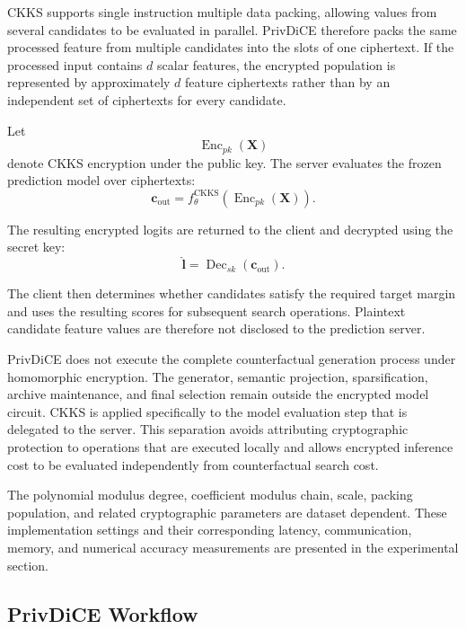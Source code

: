 \documentclass[preprint,12pt]{elsarticle}
\begin{document}
CKKS supports single instruction multiple data packing, allowing values from
several candidates to be evaluated in parallel. PrivDiCE therefore packs the
same processed feature from multiple candidates into the slots of one
ciphertext. If the processed input contains $d$ scalar features, the encrypted
population is represented by approximately $d$ feature ciphertexts rather than
by an independent set of ciphertexts for every candidate.

Let
\begin{equation}
\operatorname{Enc}_{pk}(\mathbf{X})
\end{equation}
denote CKKS encryption under the public key. The server evaluates the frozen
prediction model over ciphertexts:
\begin{equation}
\mathbf{c}_{\mathrm{out}}
=
f_{\theta}^{\mathrm{CKKS}}
\left(
\operatorname{Enc}_{pk}(\mathbf{X})
\right).
\label{eq:encrypted_inference}
\end{equation}

The resulting encrypted logits are returned to the client and decrypted using
the secret key:
\begin{equation}
\hat{\mathbf{l}}
=
\operatorname{Dec}_{sk}
\left(
\mathbf{c}_{\mathrm{out}}
\right).
\label{eq:decrypt_logits}
\end{equation}

The client then determines whether candidates satisfy the required target
margin and uses the resulting scores for subsequent search operations.
Plaintext candidate feature values are therefore not disclosed to the
prediction server.

PrivDiCE does not execute the complete counterfactual generation process under
homomorphic encryption. The generator, semantic projection, sparsification,
archive maintenance, and final selection remain outside the encrypted model
circuit. CKKS is applied specifically to the model evaluation step that is
delegated to the server. This separation avoids attributing cryptographic
protection to operations that are executed locally and allows encrypted
inference cost to be evaluated independently from counterfactual search cost.

The polynomial modulus degree, coefficient modulus chain, scale, packing
population, and related cryptographic parameters are dataset dependent. These
implementation settings and their corresponding latency, communication, memory,
and numerical accuracy measurements are presented in the experimental section.


\subsection{PrivDiCE Workflow}
\label{subsec:overall_algorithm}
\end{document}
